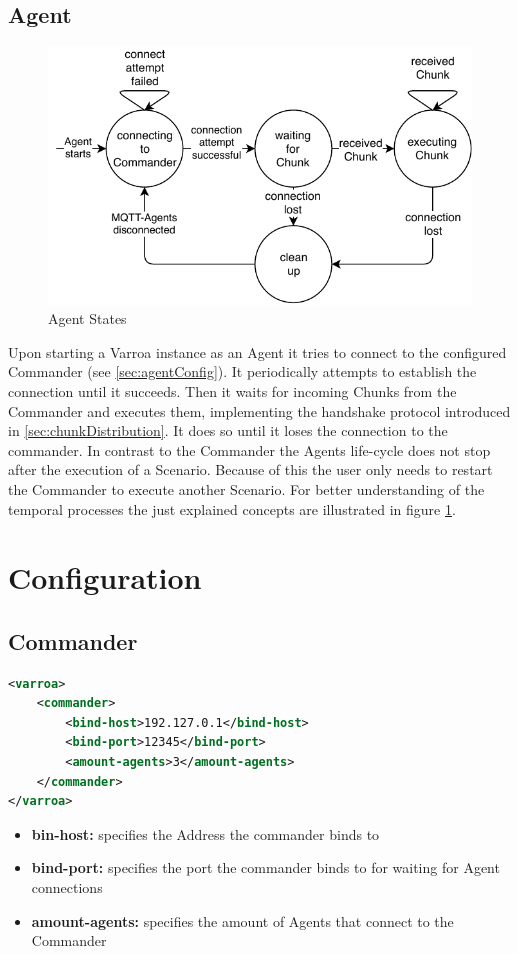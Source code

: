 \subsection{Agent}
\begin{figure}[H]
	\begin{center}
	\includegraphics[scale=0.9]{Resources/PDF/AgentStates}
	\caption{Agent States}
	\label{pic:AgentStates}
	\end{center}
\end{figure}
Upon starting a Varroa instance as an Agent it tries to connect to the configured Commander (see \ref{sec:agentConfig}).
It periodically attempts to establish the connection until it succeeds.
Then it waits for incoming Chunks from the Commander and executes them, implementing the handshake protocol introduced in \ref{sec:chunkDistribution}.
It does so until it loses the connection to the commander.
In contrast to the Commander the Agents life-cycle does not stop after the execution of a Scenario.
Because of this the user only needs to restart the Commander to execute another Scenario.
For better understanding of the temporal processes the just explained concepts are illustrated in figure \ref{pic:AgentStates}.

\section{Configuration}
\subsection{Commander}\label{sec:commanderConfig}
\begin{lstlisting}[caption={Commander XML configuration}, captionpos=b, label={lst:commanderConfig}, language=XML]
<varroa>
    <commander>
		<bind-host>192.127.0.1</bind-host>
        <bind-port>12345</bind-port>
        <amount-agents>3</amount-agents>
    </commander>
</varroa>
\end{lstlisting}
\begin{itemize}
	\item \textbf{bin-host:} specifies the Address the commander binds to
	\item \textbf{bind-port:} specifies the port the commander binds to for waiting for Agent connections
	\item \textbf{amount-agents:} specifies the amount of Agents that connect to the Commander
\end{itemize}

